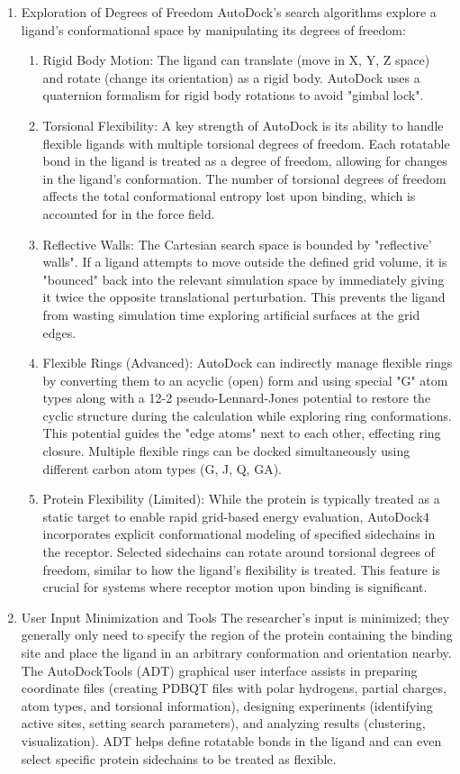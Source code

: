 \documentclass[11pt]{article}
\begin{document}
\begin{enumerate}
\item Exploration of Degrees of Freedom
AutoDock's search algorithms explore a ligand's conformational space by manipulating its degrees of freedom:
\begin{enumerate}
\item Rigid Body Motion: The ligand can translate (move in X, Y, Z space) and rotate (change its orientation) as a rigid body. AutoDock uses a quaternion formalism for rigid body rotations to avoid "gimbal lock".
\item Torsional Flexibility: A key strength of AutoDock is its ability to handle flexible ligands with multiple torsional degrees of freedom. Each rotatable bond in the ligand is treated as a degree of freedom, allowing for changes in the ligand's conformation. The number of torsional degrees of freedom affects the total conformational entropy lost upon binding, which is accounted for in the force field.
\item Reflective Walls: The Cartesian search space is bounded by "reflective' walls". If a ligand attempts to move outside the defined grid volume, it is "bounced" back into the relevant simulation space by immediately giving it twice the opposite translational perturbation. This prevents the ligand from wasting simulation time exploring artificial surfaces at the grid edges.
\item Flexible Rings (Advanced): AutoDock can indirectly manage flexible rings by converting them to an acyclic (open) form and using special "G" atom types along with a 12-2 pseudo-Lennard-Jones potential to restore the cyclic structure during the calculation while exploring ring conformations. This potential guides the "edge atoms" next to each other, effecting ring closure. Multiple flexible rings can be docked simultaneously using different carbon atom types (G, J, Q, GA).
\item Protein Flexibility (Limited): While the protein is typically treated as a static target to enable rapid grid-based energy evaluation, AutoDock4 incorporates explicit conformational modeling of specified sidechains in the receptor. Selected sidechains can rotate around torsional degrees of freedom, similar to how the ligand's flexibility is treated. This feature is crucial for systems where receptor motion upon binding is significant.
\end{enumerate}
\item User Input Minimization and Tools
The researcher's input is minimized; they generally only need to specify the region of the protein containing the binding site and place the ligand in an arbitrary conformation and orientation nearby. The AutoDockTools (ADT) graphical user interface assists in preparing coordinate files (creating PDBQT files with polar hydrogens, partial charges, atom types, and torsional information), designing experiments (identifying active sites, setting search parameters), and analyzing results (clustering, visualization). ADT helps define rotatable bonds in the ligand and can even select specific protein sidechains to be treated as flexible.

\end{enumerate}
\end{document}
